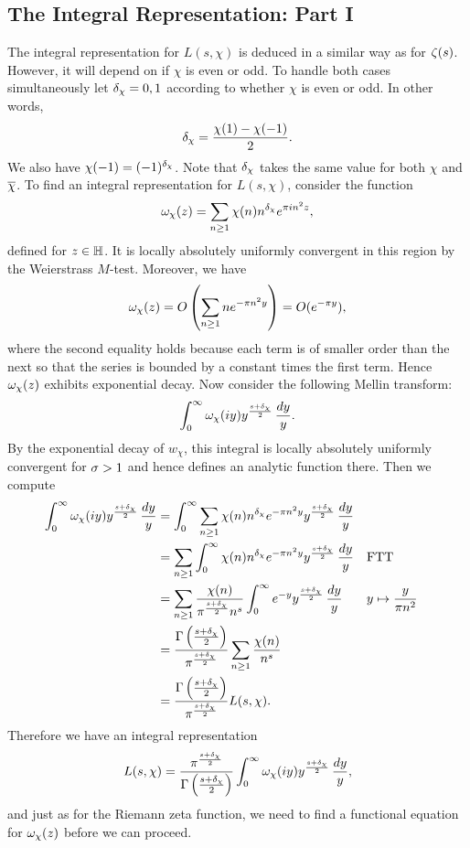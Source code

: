    \subsection*{The Integral Representation: Part I}
      The integral representation for $L(s,\chi)$ is deduced in a similar way as for $\zeta(s)$. However, it will depend on if $\chi$ is even or odd. To handle both cases simultaneously let $\delta_{\chi} = 0,1$ according to whether $\chi$ is even or odd. In other words,
      \[
        \delta_{\chi} = \frac{\chi(1)-\chi(-1)}{2}.
      \]
      We also have $\chi(-1) = (-1)^{\delta_{\chi}}$. Note that $\delta_{\chi}$ takes the same value for both $\chi$ and $\overline{\chi}$. To find an integral representation for $L(s,\chi)$, consider the function
      \[
        \omega_{\chi}(z) = \sum_{n \ge 1}\chi(n)n^{\delta_{\chi}}e^{\pi in^{2}z},
      \]
      defined for $z \in \mathbb{H}$. It is locally absolutely uniformly convergent in this region by the Weierstrass $M$-test. Moreover, we have
      \[
        \omega_{\chi}(z) = O\left(\sum_{n \ge 1}ne^{-\pi n^{2}y}\right) = O(e^{-\pi y}),
      \]
      where the second equality holds because each term is of smaller order than the next so that the series is bounded by a constant times the first term. Hence $\omega_{\chi}(z)$ exhibits exponential decay. Now consider the following Mellin transform:
      \[
        \int_{0}^{\infty}\omega_{\chi}(iy)y^{\frac{s+\delta_{\chi}}{2}}\,\frac{dy}{y}.
      \]
      By the exponential decay of $w_{\chi}$, this integral is locally absolutely uniformly convergent for $\sigma > 1$ and hence defines an analytic function there. Then we compute
      \begin{align*}
        \int_{0}^{\infty}\omega_{\chi}(iy)y^{\frac{s+\delta_{\chi}}{2}}\,\frac{dy}{y} &= \int_{0}^{\infty}\sum_{n \ge 1}\chi(n)n^{\delta_{\chi}}e^{-\pi n^{2}y}y^{\frac{s+\delta_{\chi}}{2}}\,\frac{dy}{y} \\
        &= \sum_{n \ge 1}\int_{0}^{\infty}\chi(n)n^{\delta_{\chi}}e^{-\pi n^{2}y}y^{\frac{s+\delta_{\chi}}{2}}\,\frac{dy}{y} && \text{FTT} \\
        &= \sum_{n \ge 1}\frac{\chi(n)}{\pi^{\frac{s+\delta_{\chi}}{2}}n^{s}}\int_{0}^{\infty}e^{-y}y^{\frac{s+\delta_{\chi}}{2}}\,\frac{dy}{y} && \text{$y \mapsto \frac{y}{\pi n^{2}}$} \\
        &= \frac{\Gamma\left(\frac{s+\delta_{\chi}}{2}\right)}{\pi^{\frac{s+\delta_{\chi}}{2}}}\sum_{n \ge 1}\frac{\chi(n)}{n^{s}} \\
        &= \frac{\Gamma\left(\frac{s+\delta_{\chi}}{2}\right)}{\pi^{\frac{s+\delta_{\chi}}{2}}}L(s,\chi).
      \end{align*}
      Therefore we have an integral representation
      \begin{equation}\label{equ:integral_representation_Dirichlet_L-functions_1}
        L(s,\chi) = \frac{\pi^{\frac{s+\delta_{\chi}}{2}}}{\Gamma\left(\frac{s+\delta_{\chi}}{2}\right)}\int_{0}^{\infty}\omega_{\chi}(iy)y^{\frac{s+\delta_{\chi}}{2}}\,\frac{dy}{y},
      \end{equation}
      and just as for the Riemann zeta function, we need to find a functional equation for $\omega_{\chi}(z)$ before we can proceed.

